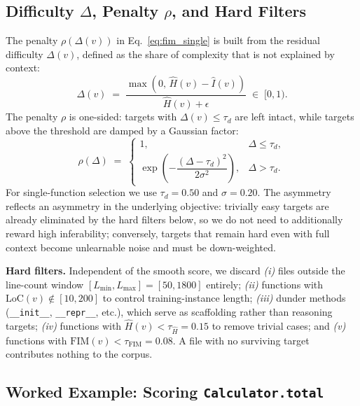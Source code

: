 \subsection{Difficulty $\Delta$, Penalty $\rho$, and Hard Filters}
\label{app:algo:penalty}

The penalty $\rho(\Delta(v))$ in Eq.~\eqref{eq:fim_single} is built from
the residual difficulty $\Delta(v)$, defined as the share of complexity
that is not explained by context:
\begin{equation}
  \Delta(v) \;=\; \frac{\max\!\left(0,\,\hat{H}(v) - \hat{I}(v)\right)}{\hat{H}(v) + \epsilon}
  \;\in\; [0, 1).
  \label{eq:delta}
\end{equation}
The penalty $\rho$ is one-sided: targets with $\Delta(v) \le \tau_d$ are
left intact, while targets above the threshold are damped by a Gaussian
factor:
\begin{equation}
  \rho(\Delta) \;=\;
  \begin{cases}
    1, & \Delta \le \tau_d, \\[2pt]
    \exp\!\left(-\dfrac{(\Delta - \tau_d)^2}{2\sigma^2}\right), & \Delta > \tau_d.
  \end{cases}
  \label{eq:penalty}
\end{equation}
For single-function selection we use $\tau_d = 0.50$ and $\sigma = 0.20$.
The asymmetry reflects an asymmetry in the underlying objective:
trivially easy targets are already eliminated by the hard filters below,
so we do not need to additionally reward high inferability; conversely,
targets that remain hard even with full context become unlearnable noise
and must be down-weighted.

\textbf{Hard filters.}
Independent of the smooth score, we discard \emph{(i)} files outside
the line-count window $[L_{\min}, L_{\max}] = [50, 1800]$ entirely;
\emph{(ii)} functions with $\mathrm{LoC}(v) \notin [10, 200]$ to control
training-instance length; \emph{(iii)} dunder methods
(\texttt{\_\_init\_\_}, \texttt{\_\_repr\_\_}, etc.), which serve as
scaffolding rather than reasoning targets; \emph{(iv)} functions with
$\hat{H}(v) < \tau_{\hat H} = 0.15$ to remove trivial cases; and
\emph{(v)} functions with $\mathrm{FIM}(v) < \tau_{\mathrm{FIM}} = 0.08$.
A file with no surviving target contributes nothing to the corpus.

\subsection{Worked Example: Scoring \texttt{Calculator.total}}
\label{app:algo:worked_example}

